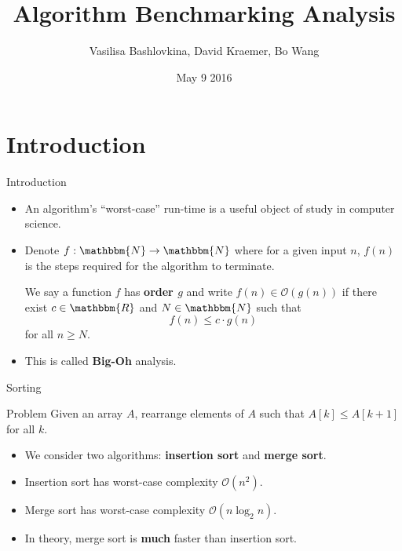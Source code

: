 \documentclass[]{beamer}
\title[MAT 336 Final Project]{Algorithm Benchmarking Analysis}
\author{Vasilisa Bashlovkina, David Kraemer, Bo Wang}
\date{May 9 2016}
\renewcommand{\emph}{\textbf}
\newcommand{\N}{\mathbbm{N}}
\newcommand{\R}{\mathbbm{R}}
\newcommand{\Order}{\mathcal{O}}
\begin{document}
\begin{frame}
\titlepage
\end{frame}

\section{Introduction}


\begin{frame}[t]{Introduction}

\begin{itemize}
	\item An algorithm's ``worst-case'' run-time is a useful object of study in computer science.
    \item Denote $f : \N \to \N$ where for a given input $n$, $f(n)$ is the steps required for the algorithm to terminate.
    \begin{definition}
	We say a function $f$ has \emph{order $g$} and write $f(n) \in \Order(g(n))$ if there exist $c \in \R$ and $N \in \N$ such that
    \[
    f(n) \leq c \cdot g(n)
    \]
    for all $n \geq N$. 
	\end{definition}
    \item This is called \emph{Big-Oh} analysis.
\end{itemize}
\end{frame}

\begin{frame}[t]{Sorting}
\begin{block}{Problem}
Given an array $A$, rearrange elements of $A$ such that $A[k] \leq A[k+1]$ for all $k$.
\end{block}
\begin{itemize}
	\item We consider two algorithms: \emph{insertion sort} and \emph{merge sort}.
    \item Insertion sort has worst-case complexity $\Order(n^2)$.
    \item Merge sort has worst-case complexity $\Order(n \log_2 n)$.
    \item In theory, merge sort is \emph{much} faster than insertion sort.
\end{itemize}
\end{frame}

\begin{frame}[t]
    \centering
\end{frame}

\begin{frame}[t]
    \centering
\end{frame}
\end{document}
